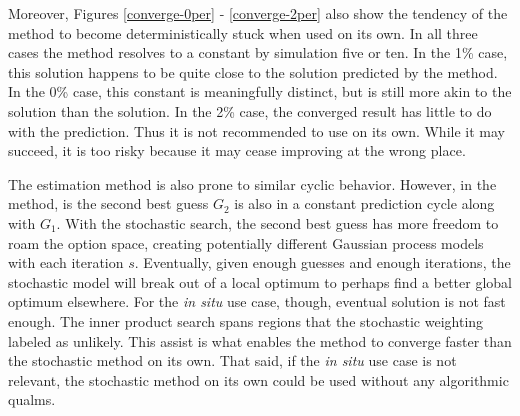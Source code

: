 Moreover,
Figures \ref{converge-0per} - \ref{converge-2per} also show the tendency of
the \innerprod method to become deterministically stuck when used on its own.
In all three cases the \innerprod method resolves to a constant by 
simulation five or ten.  In the 1\% case, this solution happens to be quite close
to the solution predicted by the \allflag method.  In the 0\% case, this
constant is meaningfully distinct, but is still more akin to the \stochastic 
solution than the \allflag solution.  In the 2\% case, the converged \innerprod
result has little to do with the \allflag prediction.  Thus it is not
recommended to use \innerprod on its own. While it may succeed, it is too 
risky because it may cease improving at the wrong place.

The \stochastic estimation method is also prone to similar cyclic behavior.
However, in the \innerprod method, 
is the second best guess $G_2$ is also in a constant prediction cycle along 
with $G_1$.  With the stochastic search, the second best 
guess has more freedom to roam the option space, creating potentially 
different Gaussian process models with each iteration $s$.  Eventually, given 
enough guesses and enough iterations, the stochastic model will break 
out of a local optimum to perhaps find a better global optimum elsewhere.
For the \emph{in situ} use case, though, eventual solution is not fast
enough.  The inner product search spans regions that the stochastic weighting
labeled as unlikely.  This assist is what enables the \allflag method
to converge faster than the stochastic method on its own.  That said, 
if the \emph{in situ} use case is not relevant, the stochastic method on 
its own could be used without any algorithmic qualms.

